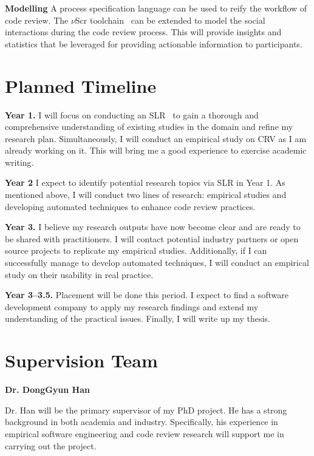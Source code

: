 \documentclass[letterpaper]{article}
\begin{document}
\noindent
{\bf Modelling} A process specification language can be used to reify the workflow of code review.
The $\nu$Scr toolchain~\cite{Yoshida21} can be extended to model the social interactions during the code review process.
This will provide insights and statistics that be leveraged for providing actionable information to participants.

\section{Planned Timeline}

\noindent
{\bf Year 1.} I will focus on conducting an SLR~\cite{Kitchenham10} to gain a thorough and comprehensive understanding of existing studies in the domain and refine my research plan.
Simultaneously, I will conduct an empirical study on CRV as I am already working on it.
This will bring me a good experience to exercise academic writing.

\noindent
{\bf Year 2} I expect to identify potential research topics via SLR in Year 1.
As mentioned above, I will conduct two lines of research: empirical studies and developing automated techniques to enhance code review practices.

\noindent
{\bf Year 3.} I believe my research outputs have now become clear and are ready to be shared with practitioners.
I will contact potential industry partners or open source projects to replicate my empirical studies.
Additionally, if I can successfully manage to develop automated techniques, I will conduct an empirical study on their usability in real practice.

\noindent
{\bf Year 3--3.5.} Placement will be done this period.
I expect to find a software development company to apply my research findings and extend my understanding of the practical issues.
Finally, I will write up my thesis. 



\section{Supervision Team}

\noindent
{\bf Dr. DongGyun Han}

Dr. Han will be the primary supervisor of my PhD project.
He has a strong background in both academia and industry.
Specifically, his experience in empirical software engineering and code review research will support me in carrying out the project.
\end{document}
